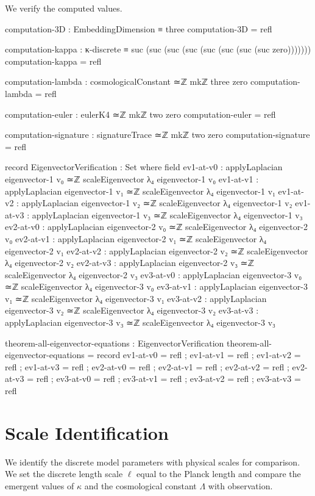 \documentclass[11pt,a4paper]{book}
\begin{document}
We verify the computed values.

\begin{code}
computation-3D : EmbeddingDimension ≡ three
computation-3D = refl

computation-kappa : κ-discrete ≡ suc (suc (suc (suc (suc (suc (suc (suc zero)))))))
computation-kappa = refl

computation-lambda : cosmologicalConstant ≃ℤ mkℤ three zero
computation-lambda = refl

computation-euler : eulerK4 ≃ℤ mkℤ two zero
computation-euler = refl

computation-signature : signatureTrace ≃ℤ mkℤ two zero
computation-signature = refl

record EigenvectorVerification : Set where
  field
    ev1-at-v0 : applyLaplacian eigenvector-1 v₀ ≃ℤ scaleEigenvector λ₄ eigenvector-1 v₀
    ev1-at-v1 : applyLaplacian eigenvector-1 v₁ ≃ℤ scaleEigenvector λ₄ eigenvector-1 v₁
    ev1-at-v2 : applyLaplacian eigenvector-1 v₂ ≃ℤ scaleEigenvector λ₄ eigenvector-1 v₂
    ev1-at-v3 : applyLaplacian eigenvector-1 v₃ ≃ℤ scaleEigenvector λ₄ eigenvector-1 v₃
    ev2-at-v0 : applyLaplacian eigenvector-2 v₀ ≃ℤ scaleEigenvector λ₄ eigenvector-2 v₀
    ev2-at-v1 : applyLaplacian eigenvector-2 v₁ ≃ℤ scaleEigenvector λ₄ eigenvector-2 v₁
    ev2-at-v2 : applyLaplacian eigenvector-2 v₂ ≃ℤ scaleEigenvector λ₄ eigenvector-2 v₂
    ev2-at-v3 : applyLaplacian eigenvector-2 v₃ ≃ℤ scaleEigenvector λ₄ eigenvector-2 v₃
    ev3-at-v0 : applyLaplacian eigenvector-3 v₀ ≃ℤ scaleEigenvector λ₄ eigenvector-3 v₀
    ev3-at-v1 : applyLaplacian eigenvector-3 v₁ ≃ℤ scaleEigenvector λ₄ eigenvector-3 v₁
    ev3-at-v2 : applyLaplacian eigenvector-3 v₂ ≃ℤ scaleEigenvector λ₄ eigenvector-3 v₂
    ev3-at-v3 : applyLaplacian eigenvector-3 v₃ ≃ℤ scaleEigenvector λ₄ eigenvector-3 v₃

theorem-all-eigenvector-equations : EigenvectorVerification
theorem-all-eigenvector-equations = record
  { ev1-at-v0 = refl
  ; ev1-at-v1 = refl
  ; ev1-at-v2 = refl
  ; ev1-at-v3 = refl
  ; ev2-at-v0 = refl
  ; ev2-at-v1 = refl
  ; ev2-at-v2 = refl
  ; ev2-at-v3 = refl
  ; ev3-at-v0 = refl
  ; ev3-at-v1 = refl
  ; ev3-at-v2 = refl
  ; ev3-at-v3 = refl
  }
\end{code}

\section{Scale Identification}

We identify the discrete model parameters with physical scales for comparison. We set the discrete length scale $\ell$ equal to the Planck length and compare the emergent values of $\kappa$ and the cosmological constant $\Lambda$ with observation.
\end{document}
